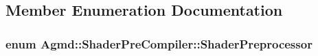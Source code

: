 \subsection{Member Enumeration Documentation}
\hypertarget{class_agmd_1_1_shader_pre_compiler_aa972735de2129e4ea164dbb29d8ce83f}{
\subsubsection[{Shader\+Preprocessor}]{\setlength{\rightskip}{0pt plus 5cm}enum {\bf Agmd\+::\+Shader\+Pre\+Compiler\+::\+Shader\+Preprocessor}}}\label{class_agmd_1_1_shader_pre_compiler_aa972735de2129e4ea164dbb29d8ce83f}
